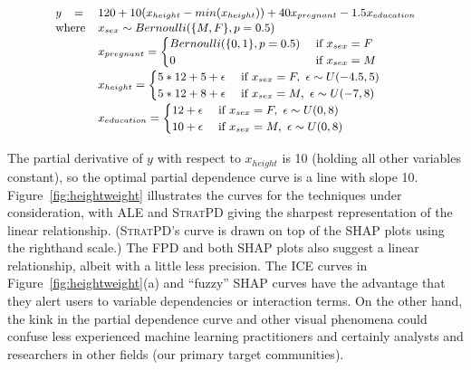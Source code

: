\documentclass[smallextended]{svjour3}       %
\newcommand{\figref}[1]{Figure~\ref{#1}}
\newcommand{\spd}{\fontfamily{cmr}\textsc{\small StratPD}}
\begin{document}
\begin{equation}\label{eq:weight}
{\small
\begin{array}{rll}
y & = &120 + 10(x_{height} - min(x_{height})) + 40x_{pregnant} - 1.5x_{education}\\
\vspace{-10pt}\\
\multicolumn{2}{r}{\text{where}} & x_{sex} \sim Bernoulli(\{M,F\}, p=0.5)\\
                    & & x_{pregnant} = \begin{cases}
                                               Bernoulli(\{0,1\},p=0.5) & \text{ if } x_{sex} = F\\
                                               0 & \text{ if } x_{sex}=M\\
                                               \end{cases}\\
                    & & x_{height} = \begin{cases}
                                               5*12+5+ \epsilon & \text{ if } x_{sex}=F,~ \epsilon \sim U(-4.5,5)\\	
                                               5*12+8 + \epsilon & \text{ if } x_{sex}=M,~ \epsilon \sim U(-7,8)\\
                                               \end{cases}\\
                    & & x_{education} = \begin{cases}
                                               12 + \epsilon & \text{ if } x_{sex}=F,~ \epsilon \sim U(0,8)\\	
                                               10 + \epsilon & \text{ if } x_{sex}=M,~ \epsilon \sim U(0,8)\\
                                               \end{cases}
\end{array}
}
\end{equation}

\noindent The partial derivative of $y$ with respect to $x_{height}$ is 10 (holding all other variables constant), so the optimal partial dependence curve is a line with slope 10. \figref{fig:heightweight} illustrates the curves for the techniques under consideration, with ALE and \spd{} giving the sharpest representation of the linear relationship. (\spd's curve is drawn on top of the SHAP plots using the righthand scale.) The FPD and both SHAP plots also suggest a linear relationship, albeit with a little less precision. The ICE curves in \figref{fig:heightweight}(a) and ``fuzzy'' SHAP curves have the advantage that they alert users to variable  dependencies or interaction terms.  On the other hand, the kink in the partial dependence curve and other visual phenomena could confuse less experienced machine learning practitioners and certainly analysts and researchers in other fields (our primary target communities).
\end{document}
